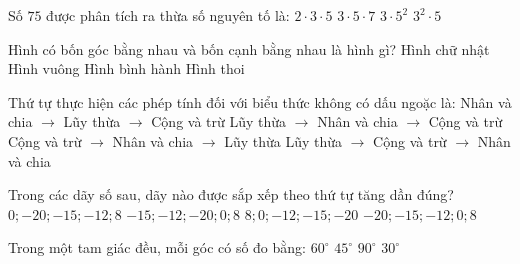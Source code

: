 \documentclass[12pt,a4paper]{article}
\begin{document}
\begin{ex}
Số $75$ được phân tích ra thừa số nguyên tố là:
\choice
{$2 \cdot 3 \cdot 5$}
{$3 \cdot 5 \cdot 7$}
{\True $3 \cdot 5^2$}
{$3^2 \cdot 5$}
\end{ex}

\begin{ex}
Hình có bốn góc bằng nhau và bốn cạnh bằng nhau là hình gì?
\choice
{Hình chữ nhật}
{\True Hình vuông}
{Hình bình hành}
{Hình thoi}
\end{ex}

\begin{ex}
Thứ tự thực hiện các phép tính đối với biểu thức không có dấu ngoặc là:
\choice
{Nhân và chia $\to$ Lũy thừa $\to$ Cộng và trừ}
{\True Lũy thừa $\to$ Nhân và chia $\to$ Cộng và trừ}
{Cộng và trừ $\to$ Nhân và chia $\to$ Lũy thừa}
{Lũy thừa $\to$ Cộng và trừ $\to$ Nhân và chia}
\end{ex}

\begin{ex}
Trong các dãy số sau, dãy nào được sắp xếp theo thứ tự tăng dần đúng?
\choice
{$0; -20; -15; -12; 8$}
{$-15; -12; -20; 0; 8$}
{$8; 0; -12; -15; -20$}
{\True $-20; -15; -12; 0; 8$}
\end{ex}

\begin{ex}
\end{ex}

\begin{ex}
Trong một tam giác đều, mỗi góc có số đo bằng:
\choice
{\True $60^\circ$}
{$45^\circ$}
{$90^\circ$}
{$30^\circ$}
\end{ex}
\end{document}
